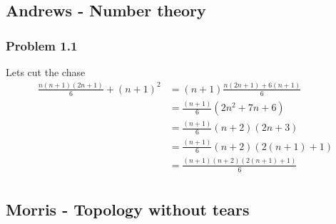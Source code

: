 \documentclass[10pt,a4paper]{book}
\theoremstyle{definition}
\begin{document}
\subsection{{\sc Andrews} - Number theory}
\subsubsection{Problem 1.1}
Lets cut the chase
\begin{align}
\frac{n(n+1)(2n+1)}{6}+(n+1)^2
&=(n+1)\frac{n(2n+1)+6(n+1)}{6}\\
&=\frac{(n+1)}{6}(2n^2+7n+6)\\
&=\frac{(n+1)}{6}(n+2)(2n+3)\\
&=\frac{(n+1)}{6}(n+2)(2(n+1)+1)\\
&=\frac{(n+1)(n+2)(2(n+1)+1)}{6}\\
\end{align}

\subsection{{\sc Morris} - Topology without tears}
\end{document}
